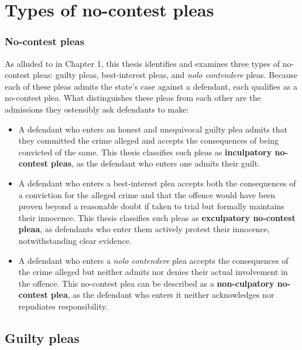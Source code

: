 \section{Types of no-contest pleas}

\subsubsection{No-contest pleas}

As alluded to in Chapter 1, this thesis identifies and examines three types of no-contest pleas: guilty pleas, best-interest pleas, and \textit{nolo contendere} pleas. Because each of these pleas admits the state's case against a defendant, each qualifies as a no-contest plea. What distinguishes these pleas from each other are the admissions they ostensibly ask defendants to make: 

\begin{itemize}

    \item A defendant who enters an honest and unequivocal guilty plea admits that they committed the crime alleged and accepts the consequences of being convicted of the same. This thesis classifies such pleas as \textbf{inculpatory no-contest pleas}, as the defendant who enters one admits their guilt.
    
    \item A defendant who enters a best-interest plea accepts both the consequences of a conviction for the alleged crime and that the offence would have been proven beyond a reasonable doubt if taken to trial but formally maintains their innocence. This thesis classifies such pleas as \textbf{exculpatory no-contest pleaa}, as defendants who enter them actively protest their innocence, notwithstanding clear evidence.
    
    \item A defendant who enters a \textit{nolo contendere} plea accepts the consequences of the crime alleged but neither admits nor denies their actual involvement in the offence. This no-contest plea can be described as a \textbf{non-culpatory no-contest plea}, as the defendant who enters it neither acknowledges nor repudiates responsibility.
    
\end{itemize}

\subsection{Guilty pleas}

